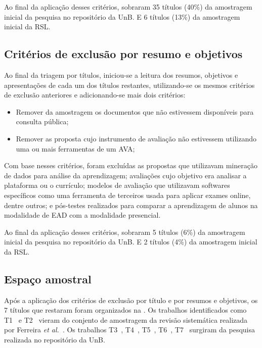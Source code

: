 Ao final da aplicação desses critérios, sobraram 35 títulos (40\%) da amostragem inicial da pesquisa no repositório da UnB. E 6 títulos (13\%) da amostragem inicial da RSL.

\subsection{Critérios de exclusão por resumo e objetivos}%

Ao final da triagem por títulos, iniciou-se a leitura dos resumos, objetivos e apresentações de cada um dos títulos restantes, utilizando-se os mesmos critérios de exclusão anteriores e adicionando-se mais dois critérios:

\begin{itemize}
    \item Remover da amostragem os documentos que não estivessem disponíveis para consulta pública;
    \item Remover as proposta cujo instrumento de avaliação não estivessem utilizando uma ou mais ferramentas de um AVA; 
\end{itemize}

Com base nesses critérios, foram excluídas as propostas que utilizavam mineração de dados para análise da aprendizagem; avaliações cujo objetivo era analisar a plataforma ou o currículo; modelos de avaliação que utilizavam softwares específicos como uma ferramenta de terceiros usada para aplicar exames online, dentre outros; e pós-testes realizados para comparar a aprendizagem de alunos na modalidade de EAD com a modalidade presencial.

Ao final da aplicação desses critérios, sobraram 5 títulos (6\%) da amostragem inicial da pesquisa no repositório da UnB. E 2 títulos (4\%) da amostragem inicial da RSL.

\subsection{Espaço amostral}%

Após a aplicação dos critérios de exclusão por título e por resumos e objetivos, os 7 títulos que restaram foram organizados na . Os trabalhos identificados como T1~\cite{t1@ead} e T2~\cite{t2@ead} vieram do conjento de amostragem da revisão sistemática realizada por Ferreira \emph{et al.}~\cite{Ferreira@2017}. Os trabalhos T3~\cite{t3@ead}, T4~\cite{t4@ead}, T5~\cite{t5@ead}, T6~\cite{t6@ead}, T7~\cite{t7@ead} surgiram da pesquisa realizada no repositório da UnB.

